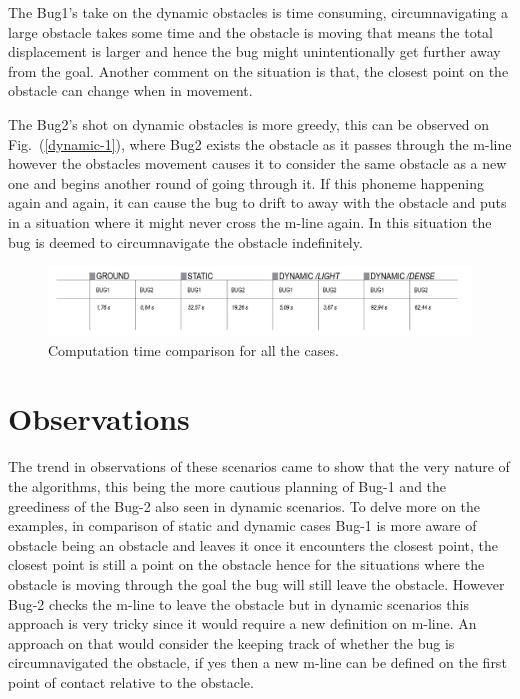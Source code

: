 \documentclass{IEEEtaes}
\begin{document}
The Bug1's take on the dynamic obstacles is time consuming, circumnavigating a large obstacle takes some time and the obstacle is moving that means the total displacement is larger and hence the bug might unintentionally get further away from the goal. Another comment on the situation is that, the closest point on the obstacle can change when in movement.

The Bug2's shot on dynamic obstacles is more greedy, this can be observed on Fig.~(\ref{dynamic-1}), where Bug2 exists the obstacle as it passes through the m-line however the obstacles movement causes it to consider the same obstacle as a new one and begins another round of going through it. If this phoneme happening again and again, it can cause the bug to drift to away with the obstacle and puts in a situation where it might never cross the m-line again. In this situation the bug is deemed to circumnavigate the obstacle indefinitely.

\begin{figure}[b!]
    \begin{center}
        \includegraphics[width=1.0\linewidth]{figures/COMP-TABLE.png}
     \end{center}
     \vspace{-1em}
     \caption{Computation time comparison for all the cases.}
     \label{comp-table}
     \vspace{-1em}
\end{figure}


\section{\large \textbf{Observations}}

The trend in observations of these scenarios came to show that the very nature of the algorithms, this being the more cautious planning of Bug-1 and the greediness of the Bug-2 also seen in dynamic scenarios. To delve more on the examples, in comparison of static and dynamic cases Bug-1 is more aware of obstacle being an obstacle and leaves it once it encounters the closest point, the closest point is still a point on the obstacle hence for the situations where the obstacle is moving through the goal the bug will still leave the obstacle. However Bug-2 checks the m-line to leave the obstacle but in dynamic scenarios this approach is very tricky since it would require a new definition on m-line. An approach on that would consider the keeping track of whether the bug is circumnavigated the obstacle, if yes then a new m-line can be defined on the first point of contact relative to the obstacle. 
\end{document}
